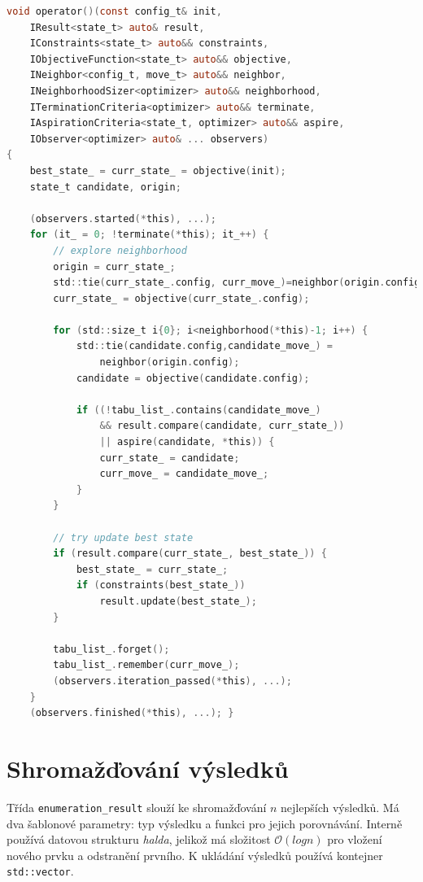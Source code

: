 \begin{lstlisting}[caption={~Implementace genetického algoritmu},label={lst:tabu:search},captionpos=t,abovecaptionskip=-\medskipamount,belowcaptionskip=\medskipamount,language=C]
void operator()(const config_t& init,
    IResult<state_t> auto& result,
    IConstraints<state_t> auto&& constraints,
    IObjectiveFunction<state_t> auto&& objective,
    INeighbor<config_t, move_t> auto&& neighbor,
    INeighborhoodSizer<optimizer> auto&& neighborhood,
    ITerminationCriteria<optimizer> auto&& terminate,
    IAspirationCriteria<state_t, optimizer> auto&& aspire,
    IObserver<optimizer> auto& ... observers)
{
    best_state_ = curr_state_ = objective(init);
    state_t candidate, origin;

    (observers.started(*this), ...);
    for (it_ = 0; !terminate(*this); it_++) {
        // explore neighborhood
        origin = curr_state_;
        std::tie(curr_state_.config, curr_move_)=neighbor(origin.config);
        curr_state_ = objective(curr_state_.config);

        for (std::size_t i{0}; i<neighborhood(*this)-1; i++) {
            std::tie(candidate.config,candidate_move_) =
                neighbor(origin.config);
            candidate = objective(candidate.config);

            if ((!tabu_list_.contains(candidate_move_)
                && result.compare(candidate, curr_state_))
                || aspire(candidate, *this)) {
                curr_state_ = candidate;
                curr_move_ = candidate_move_;
            }
        }

        // try update best state
        if (result.compare(curr_state_, best_state_)) {
            best_state_ = curr_state_;
            if (constraints(best_state_))
                result.update(best_state_);
        }

        tabu_list_.forget();
        tabu_list_.remember(curr_move_);
        (observers.iteration_passed(*this), ...);
    }
    (observers.finished(*this), ...); }
\end{lstlisting}

\section{Shromažďování výsledků}
Třída \texttt{enumeration\_result} slouží ke shromažďování $n$ nejlepších výsledků.
Má dva šablonové parametry: typ výsledku a funkci pro jejich porovnávání.
Interně používá datovou strukturu \textit{halda}, jelikož má složitost $\mathcal{O}(log{}n)$ pro vložení nového prvku a odstranění prvního.
K ukládání výsledků používá kontejner \texttt{std::vector}.

